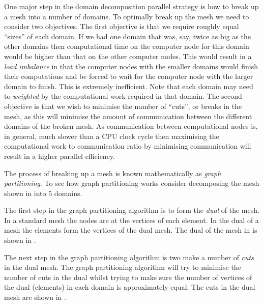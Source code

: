 One major step in the domain decomposition parallel strategy is how to
break up a mesh into a number of domains. To optimally break up the
mesh we need to consider two objectives. The first objective is that
we require roughly equal ``sizes'' of each domain. If we had one
domain that was, say, twice as big as the other domains then
computational time on the computer node for this domain would be
higher than that on the other computer nodes. This would result in
a \emph{load imbalance} in that the computer nodes with the smaller
domains would finish their computations and be forced to wait for the
computer node with the larger domain to finish. This is extremely
inefficient. Note that each domain may need to \emph{weighted} by the
computational work required in that domain. The second objective is
that we wish to minimise the number of ``cuts'', or breaks in the
mesh, as this will minimise the amount of communication between the
different domains of the broken mesh. As communication between
computational nodes is, in general, much slower than a CPU clock cycle
then maximising the computational work to communication ratio by
minimising communication will result in a higher parallel efficiency.

The process of breaking up a mesh is known mathematically
as \emph{graph partitioning}. To see how graph partitioning works
consider decomposing the mesh shown
in  into $5$ domains.


The first step in the graph partitioning algorithm is to form
the \emph{dual} of the mesh. In a standard mesh the nodes are at the
vertices of each element. In the dual of a mesh the elements form the
vertices of the dual mesh. The dual of the mesh
in  is shown
in .


The next step in the graph partitioning algorithm is two make a number of \emph{cuts} in the dual mesh. The graph partitioning algorithm will try to minimise the number of cuts in the dual whilst trying to make sure the number of vertices of the dual (elements) in each domain is approximately equal. The cuts in the dual mesh are shown in .


